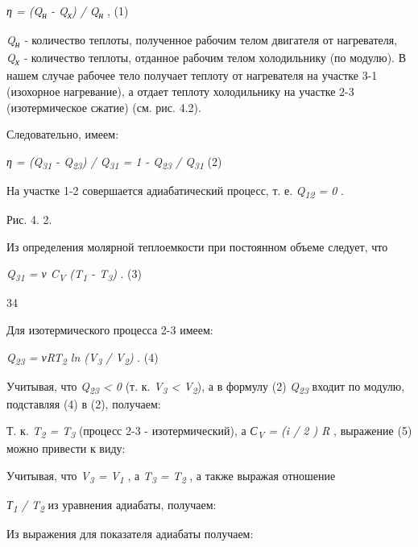 \emph{η = (Q\textsubscript{н} - Q\textsubscript{х}) /
Q\textsubscript{н}} , (1)

\emph{Q\textsubscript{н} -} количество теплоты, полученное рабочим телом
двигателя от нагревателя, \emph{Q\textsubscript{х} -} количество
теплоты, отданное рабочим телом холодильнику (по модулю). В нашем случае
рабочее тело получает теплоту от нагревателя на участке 3-1 (изохорное
нагревание), а отдает теплоту холодильнику на участке 2-3
(изотермическое сжатие) (см. рис. 4.2).

Следовательно, имеем:

\emph{η = (Q\textsubscript{31} - Q\textsubscript{23}) /
Q\textsubscript{31} = 1 - Q\textsubscript{23} / Q\textsubscript{31}} (2)

На участке 1-2 совершается адиабатический процесс, т. е.
\emph{Q\textsubscript{12} = 0} .

Рис. 4. 2.

Из определения молярной теплоемкости при постоянном объеме следует, что

\emph{Q\textsubscript{31} = ν C\textsubscript{V} (T\textsubscript{1} -
T\textsubscript{3})} . (3)

34

Для изотермического процесса 2-3 имеем:

\emph{Q\textsubscript{23} = νRT\textsubscript{2} ln (V\textsubscript{3}
/ V\textsubscript{2})} . (4)

Учитывая, что \emph{Q\textsubscript{23} \textless{} 0} (т. к.
\emph{V\textsubscript{3} \textless{} V\textsubscript{2}}), а в формулу
(2) \emph{Q\textsubscript{23}} входит по модулю, подставляя (4) в (2),
получаем:


Т. к. \emph{T\textsubscript{2} = T\textsubscript{3}} (процесс 2-3 -
изотермический), а \emph{С\textsubscript{V} = (i / 2 ) R} , выражение
(5) можно привести к виду:


Учитывая, что \emph{V\textsubscript{3} = V\textsubscript{1}} , а
\emph{T\textsubscript{3} = T\textsubscript{2}} , а также выражая
отношение

\emph{Т\textsubscript{1} / T\textsubscript{2}} из уравнения адиабаты,
получаем:


Из выражения для показателя адиабаты получаем:

